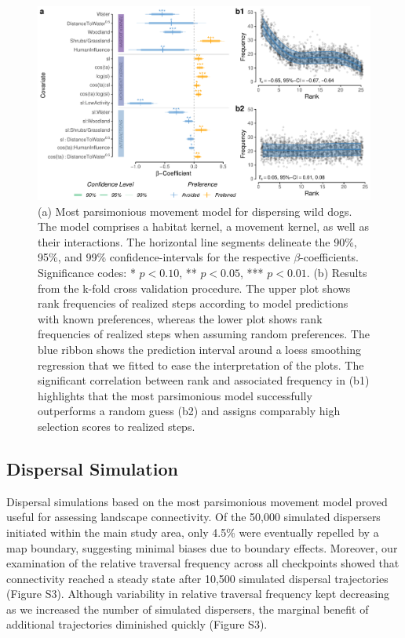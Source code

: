 \documentclass[abstract=on,10pt,a4paper,bibliography=totocnumbered]{article}
\begin{document}
\begin{figure}
  \begin{center}
    \includegraphics[width=\textwidth]{99_MovementModel}
    \caption{(a) Most parsimonious movement model for dispersing wild dogs. The
    model comprises a habitat kernel, a movement kernel, as well as their
    interactions. The horizontal line segments delineate the 90\%, 95\%, and
    99\% confidence-intervals for the respective \(\beta\)-coefficients.
    Significance codes: * \(p < 0.10\), ** \(p < 0.05\), *** \(p < 0.01\). (b)
    Results from the k-fold cross validation procedure. The upper plot shows
    rank frequencies of realized steps according to model predictions with known
    preferences, whereas the lower plot shows rank frequencies of realized steps
    when assuming random preferences. The blue ribbon shows the prediction
    interval around a loess smoothing regression that we fitted to ease the
    interpretation of the plots. The significant correlation between rank and
    associated frequency in (b1) highlights that the most parsimonious model
    successfully outperforms a random guess (b2) and assigns comparably high
    selection scores to realized steps.}
    \label{MovementModel}
  \end{center}
\end{figure}

\subsection{Dispersal Simulation}
Dispersal simulations based on the most parsimonious movement model proved
useful for assessing landscape connectivity. Of the 50,000 simulated dispersers
initiated within the main study area, only 4.5\% were eventually repelled by a
map boundary, suggesting minimal biases due to boundary effects. Moreover, our
examination of the relative traversal frequency across all checkpoints showed
that connectivity reached a steady state after 10,500 simulated dispersal
trajectories (Figure S3). Although variability in relative traversal frequency
kept decreasing as we increased the number of simulated dispersers, the marginal
benefit of additional trajectories diminished quickly (Figure S3).
\end{document}
